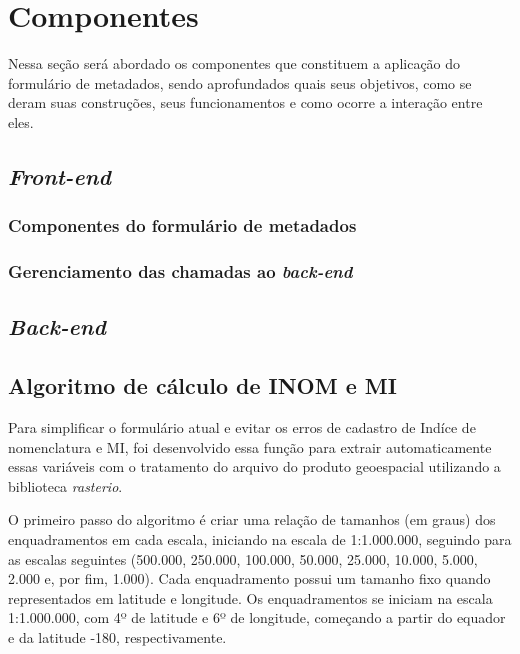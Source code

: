 \section{Componentes}



Nessa seção será abordado os componentes que constituem a aplicação do formulário de metadados, sendo aprofundados quais seus objetivos, como se deram suas construções, seus funcionamentos e como ocorre a interação entre eles.

\subsection{\textit{Front-end}}
\subsubsection{Componentes do formulário de metadados}

\subsubsection{Gerenciamento das chamadas ao \textit{back-end}}

\subsection{\textit{Back-end}}

\subsection{Algoritmo de cálculo de INOM e MI}
\label{sec:inom/mi}

Para simplificar o formulário atual e evitar os erros de cadastro de Indíce de nomenclatura e MI, foi desenvolvido essa função para extrair automaticamente essas variáveis com o tratamento do arquivo do produto geoespacial utilizando a biblioteca \textit{rasterio}.

O primeiro passo do algoritmo é criar uma relação de tamanhos (em graus) dos enquadramentos em cada escala, iniciando na escala de 1:1.000.000, seguindo para as escalas seguintes (500.000, 250.000, 100.000, 50.000, 25.000, 10.000, 5.000, 2.000 e, por fim, 1.000). Cada enquadramento possui um tamanho fixo quando representados em latitude e longitude. Os enquadramentos se iniciam na escala 1:1.000.000, com 4º de latitude e 6º de longitude, começando a partir do equador e da latitude -180, respectivamente. 

